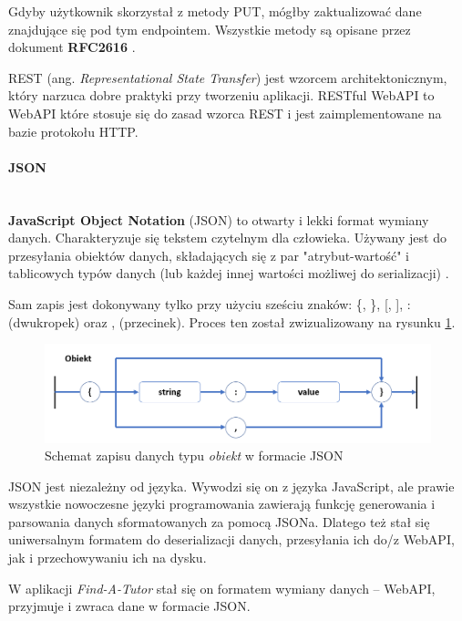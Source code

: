 \documentclass[12pt]{article}
\newcommand{\myparagraph}[1]{\paragraph{#1}\mbox{}\\}
\numberwithin{figure}{section}
\begin{document}
\begin{sloppypar}
        Gdyby użytkownik skorzystał z metody PUT, mógłby zaktualizować dane znajdujące się pod tym endpointem. Wszystkie metody są opisane przez dokument \textbf{RFC2616} \cite{http}.
        
        REST (ang. \textit{Representational State Transfer}) jest wzorcem architektonicznym, który narzuca dobre praktyki przy tworzeniu aplikacji.
        RESTful WebAPI to WebAPI które stosuje się do zasad wzorca REST i jest zaimplementowane na bazie protokołu HTTP.
        
        \myparagraph{JSON}
        \indent
        \textbf{JavaScript Object Notation} (JSON) to otwarty i lekki format wymiany danych. Charakteryzuje się tekstem czytelnym dla człowieka. Używany jest do przesyłania obiektów danych, składających się z par "atrybut-wartość" i tablicowych typów danych (lub każdej innej wartości możliwej do serializacji) \cite{json}.
        
        Sam zapis jest dokonywany tylko przy użyciu sześciu znaków: \{, \}, [, ], : (dwukropek) oraz , (przecinek). Proces ten został zwizualizowany na rysunku \ref{fig:json}.
        
        \begin{figure}[H] 
         	\centering
        	\includegraphics[width=1.0\textwidth]{images/chapter_3/json.png}
        	\caption{Schemat zapisu danych typu \textit{obiekt} w formacie JSON}
        	\label{fig:json}
        \end{figure}
        
        JSON jest niezależny od języka. Wywodzi się on z języka JavaScript, ale prawie wszystkie nowoczesne języki programowania zawierają funkcję generowania i parsowania danych sformatowanych za pomocą JSONa. Dlatego też stał się uniwersalnym formatem do deserializacji danych, przesyłania ich do/z WebAPI, jak i przechowywaniu ich na dysku.
        
        W aplikacji \textit{Find-A-Tutor} stał się on formatem wymiany danych -- WebAPI, przyjmuje i zwraca dane w formacie JSON. 
        

\end{sloppypar}
\end{document}
